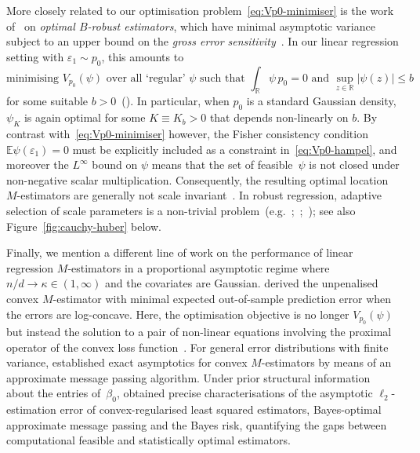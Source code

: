 \documentclass[a4paper]{article}
\newcommand{\R}{\mathbb{R}}
\newcommand{\E}{\mathbb{E}}
\theoremstyle{definition}
\begin{document}
More closely related to our optimisation problem~\eqref{eq:Vp0-minimiser} is the work of~\citet{hampel1974influence} on \textit{optimal $B$-robust estimators}, which have minimal asymptotic variance subject to an upper bound on the \textit{gross error sensitivity}~\citep[Section~2.4]{hampel2011robust}. 
In our linear regression setting with $\varepsilon_1 \sim p_0$, this amounts to 
\begin{equation}
\label{eq:Vp0-hampel}
\text{minimising }V_{p_0}(\psi) \text{ over all `regular' $\psi$ such that }\int_\R \psi\,p_0 = 0 \text{ and }\sup_{z \in \R}|\psi(z)| \leq b
\end{equation}
for some suitable $b > 0$~(\citealp[p.~121 and Section~2.5d]{hampel2011robust}). 
In particular, when $p_0$ is a standard Gaussian density, $\psi_K$ is again optimal for some $K \equiv K_b > 0$ that depends non-linearly on $b$. By contrast with~\eqref{eq:Vp0-minimiser} however, the Fisher consistency condition $\E\psi(\varepsilon_1) = 0$ must be explicitly included as a constraint in~\eqref{eq:Vp0-hampel}, and moreover the $L^\infty$ bound on $\psi$ means that the set of feasible~$\psi$ is not closed under non-negative scalar multiplication. Consequently, the resulting optimal location $M$-estimators are generally not scale invariant~\citep[p.~105]{hampel2011robust}. In robust regression, adaptive selection of scale parameters is a non-trivial problem~(e.g.~\citealp[Section~5.4]{vdV1998asymptotic};~\citealp[Section~7.7]{huber2009robust};~\citealp{loh2021scale}); see also Figure~\ref{fig:cauchy-huber} below. 

Finally, we mention a different line of work on the performance of linear regression $M$-estimators in a proportional asymptotic regime where $n/d \to \kappa \in (1,\infty)$ and the covariates are Gaussian. \citet{bean2013optimal} derived the unpenalised convex $M$-estimator with minimal expected out-of-sample prediction error when the errors are log-concave.  Here, the optimisation objective is no longer $V_{p_0}(\psi)$ but instead the solution to a pair of non-linear equations involving the proximal operator of the convex loss function~\citep{elkaroui2013robust,elkaroui2018impact}.  For general error distributions with finite variance, \cite{donoho2016high} established exact asymptotics for convex $M$-estimators by means of an approximate message passing algorithm. Under prior structural information about the entries of~$\beta_0$, \citet{celentano2022fundamental} obtained precise characterisations of the asymptotic $\ell_2$-estimation error of convex-regularised least squared estimators, Bayes-optimal approximate message passing and the Bayes risk, quantifying the gaps between computational feasible and statistically optimal estimators.
\end{document}
